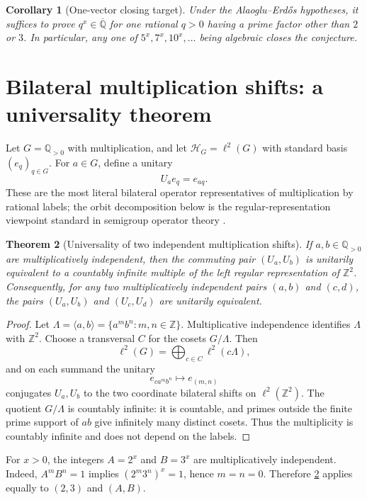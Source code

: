 \documentclass[11pt,oneside]{article}
\newtheorem{theorem}{Theorem}[section]
\newtheorem{corollary}[theorem]{Corollary}
\theoremstyle{definition}
\theoremstyle{remark}
\newcommand{\Z}{\mathbb Z}
\newcommand{\Qp}{\mathbb Q_{>0}}
\newcommand{\Alg}{\overline{\mathbb Q}}
\newcommand{\cH}{\mathcal H}
\begin{document}
\begin{corollary}[One-vector closing target]\label{cor:one-vector}
Under the Alaoglu--Erd\H{o}s hypotheses, it suffices to prove
\(q^x\in\Alg\) for one rational \(q>0\) having a prime factor other than
\(2\) or \(3\).  In particular, any one of \(5^x,7^x,10^x,\ldots\)
being algebraic closes the conjecture.
\end{corollary}

\section{Bilateral multiplication shifts: a universality theorem}

Let \(G=\Qp\) with multiplication, and let
\(\cH_G=\ell^2(G)\) with standard basis \((e_q)_{q\in G}\).  For
\(a\in G\), define a unitary
\[
        U_a e_q=e_{aq}.
\]
These are the most literal bilateral operator representatives of
multiplication by rational labels; the orbit decomposition below is the
regular-representation viewpoint standard in semigroup operator theory
\cite{Nica,LacaRaeburn}.

\begin{theorem}[Universality of two independent multiplication shifts]
\label{thm:bilateral-universal}
If \(a,b\in\Qp\) are multiplicatively independent, then the commuting
pair \((U_a,U_b)\) is unitarily equivalent to a countably infinite
multiple of the left regular representation of \(\Z^2\).  Consequently,
for any two multiplicatively independent pairs \((a,b)\) and \((c,d)\),
the pairs \((U_a,U_b)\) and \((U_c,U_d)\) are unitarily equivalent.
\end{theorem}

\begin{proof}
Let \(\Lambda=\langle a,b\rangle=\{a^mb^n:m,n\in\Z\}\).
Multiplicative independence identifies \(\Lambda\) with \(\Z^2\).
Choose a transversal \(C\) for the cosets \(G/\Lambda\).  Then
\[
        \ell^2(G)=\bigoplus_{c\in C}\ell^2(c\Lambda),
\]
and on each summand the unitary
\[
        e_{ca^mb^n}\longmapsto e_{(m,n)}
\]
conjugates \(U_a,U_b\) to the two coordinate bilateral shifts on
\(\ell^2(\Z^2)\).  The quotient \(G/\Lambda\) is countably infinite:
it is countable, and primes outside the finite prime support of \(ab\)
give infinitely many distinct cosets.  Thus the multiplicity is
countably infinite and does not depend on the labels.
\end{proof}

For \(x>0\), the integers \(A=2^x\) and \(B=3^x\) are
multiplicatively independent.  Indeed,
\(A^mB^n=1\) implies \((2^m3^n)^x=1\), hence \(m=n=0\).
Therefore \cref{thm:bilateral-universal} applies equally to
\((2,3)\) and \((A,B)\).
\end{document}
